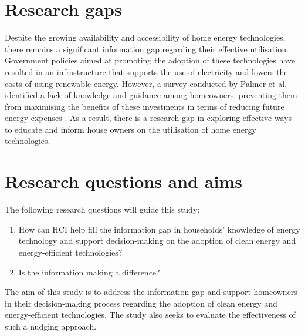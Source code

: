 \section{Research gaps}

Despite the growing availability and accessibility of home energy technologies, there remains a significant information gap regarding their effective utilisation. 
Government policies aimed at promoting the adoption of these technologies have resulted in an infrastructure that supports the use of electricity and lowers the costs of using renewable energy. 
However, a survey conducted by Palmer et al. identified a lack of knowledge and guidance among homeowners, preventing them from maximising the benefits of these investments in terms of reducing future energy expenses \cite{informationgap}. 
As a result, there is a research gap in exploring effective ways to educate and inform house owners on the utilisation of home energy technologies. 


\section{Research questions and aims}

The following research questions will guide this study: 
\begin{enumerate}
  \item How can HCI help fill the information gap in households' knowledge of energy technology and support decision-making on the adoption of clean energy and energy-efficient technologies?
  \item Is the information making a difference? 
\end{enumerate}
The aim of this study is to address the information gap and support homeowners in their decision-making process regarding the adoption of clean energy and energy-efficient technologies. 
The study also seeks to evaluate the effectiveness of such a nudging approach. 

